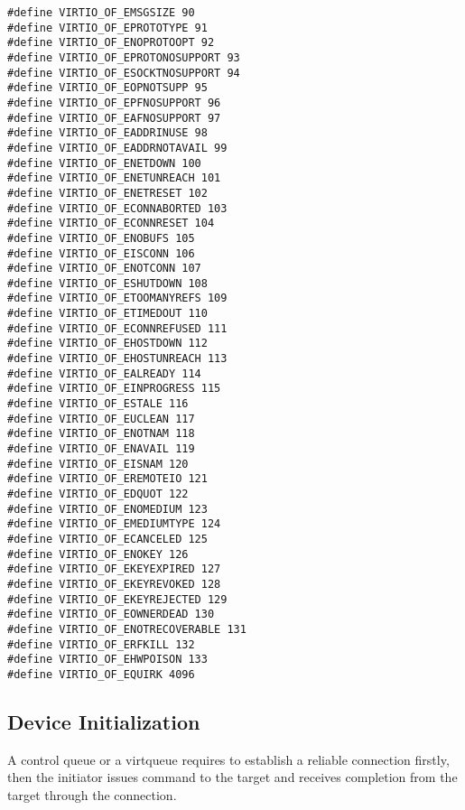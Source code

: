 \begin{lstlisting}
#define VIRTIO_OF_EMSGSIZE 90
#define VIRTIO_OF_EPROTOTYPE 91
#define VIRTIO_OF_ENOPROTOOPT 92
#define VIRTIO_OF_EPROTONOSUPPORT 93
#define VIRTIO_OF_ESOCKTNOSUPPORT 94
#define VIRTIO_OF_EOPNOTSUPP 95
#define VIRTIO_OF_EPFNOSUPPORT 96
#define VIRTIO_OF_EAFNOSUPPORT 97
#define VIRTIO_OF_EADDRINUSE 98
#define VIRTIO_OF_EADDRNOTAVAIL 99
#define VIRTIO_OF_ENETDOWN 100
#define VIRTIO_OF_ENETUNREACH 101
#define VIRTIO_OF_ENETRESET 102
#define VIRTIO_OF_ECONNABORTED 103
#define VIRTIO_OF_ECONNRESET 104
#define VIRTIO_OF_ENOBUFS 105
#define VIRTIO_OF_EISCONN 106
#define VIRTIO_OF_ENOTCONN 107
#define VIRTIO_OF_ESHUTDOWN 108
#define VIRTIO_OF_ETOOMANYREFS 109
#define VIRTIO_OF_ETIMEDOUT 110
#define VIRTIO_OF_ECONNREFUSED 111
#define VIRTIO_OF_EHOSTDOWN 112
#define VIRTIO_OF_EHOSTUNREACH 113
#define VIRTIO_OF_EALREADY 114
#define VIRTIO_OF_EINPROGRESS 115
#define VIRTIO_OF_ESTALE 116
#define VIRTIO_OF_EUCLEAN 117
#define VIRTIO_OF_ENOTNAM 118
#define VIRTIO_OF_ENAVAIL 119
#define VIRTIO_OF_EISNAM 120
#define VIRTIO_OF_EREMOTEIO 121
#define VIRTIO_OF_EDQUOT 122
#define VIRTIO_OF_ENOMEDIUM 123
#define VIRTIO_OF_EMEDIUMTYPE 124
#define VIRTIO_OF_ECANCELED 125
#define VIRTIO_OF_ENOKEY 126
#define VIRTIO_OF_EKEYEXPIRED 127
#define VIRTIO_OF_EKEYREVOKED 128
#define VIRTIO_OF_EKEYREJECTED 129
#define VIRTIO_OF_EOWNERDEAD 130
#define VIRTIO_OF_ENOTRECOVERABLE 131
#define VIRTIO_OF_ERFKILL 132
#define VIRTIO_OF_EHWPOISON 133
#define VIRTIO_OF_EQUIRK 4096
\end{lstlisting}


\subsection{Device Initialization}\label{sec:Virtio Transport Options / Virtio Over Fabrics / Device Initialization}
A control queue or a virtqueue requires to establish a reliable connection firstly, then the initiator issues command to the target and receives completion from the target through the connection.









